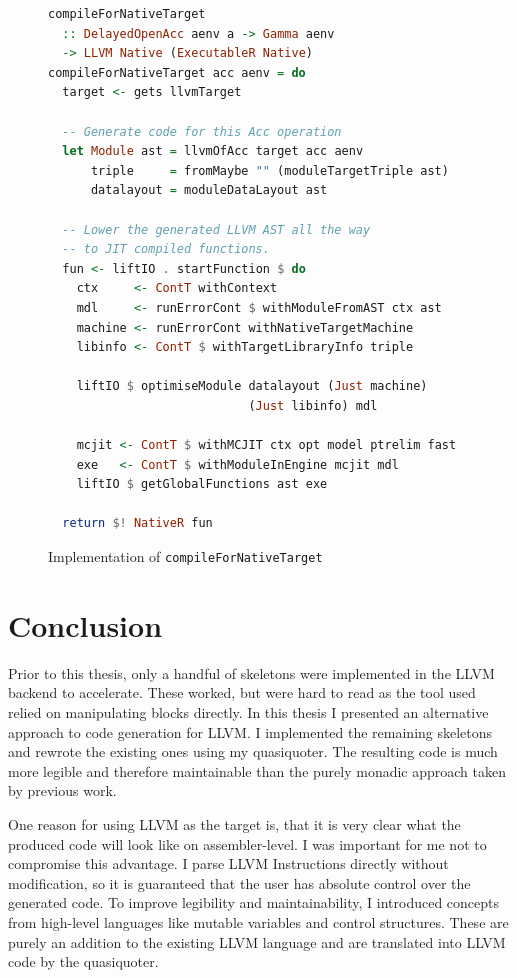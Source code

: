 \documentclass[a4paper,bibliography=totocnumbered,parskip,headsepline]{scrbook}
\begin{document}
\begin{figure}
\begin{lstlisting}[language=haskell]
compileForNativeTarget
  :: DelayedOpenAcc aenv a -> Gamma aenv
  -> LLVM Native (ExecutableR Native)
compileForNativeTarget acc aenv = do
  target <- gets llvmTarget

  -- Generate code for this Acc operation
  let Module ast = llvmOfAcc target acc aenv
      triple     = fromMaybe "" (moduleTargetTriple ast)
      datalayout = moduleDataLayout ast

  -- Lower the generated LLVM AST all the way
  -- to JIT compiled functions.
  fun <- liftIO . startFunction $ do
    ctx     <- ContT withContext
    mdl     <- runErrorCont $ withModuleFromAST ctx ast
    machine <- runErrorCont withNativeTargetMachine
    libinfo <- ContT $ withTargetLibraryInfo triple

    liftIO $ optimiseModule datalayout (Just machine)
                            (Just libinfo) mdl

    mcjit <- ContT $ withMCJIT ctx opt model ptrelim fast
    exe   <- ContT $ withModuleInEngine mcjit mdl
    liftIO $ getGlobalFunctions ast exe

  return $! NativeR fun
\end{lstlisting}
\caption{Implementation of \lstinline[language=haskell]!compileForNativeTarget!}
\label{fig:compilenative}
\end{figure}

\chapter{Conclusion}
Prior to this thesis, only a handful of skeletons were implemented in the LLVM backend to accelerate.
These worked, but were hard to read as the tool used relied on manipulating blocks directly.
In this thesis I presented an alternative approach to code generation for LLVM.
I implemented the remaining skeletons and rewrote the existing ones using my quasiquoter.
The resulting code is much more legible and therefore maintainable than the purely monadic approach taken by previous work.

One reason for using LLVM as the target is, that it is very clear what the produced code will look like on assembler-level.
I was important for me not to compromise this advantage.
I parse LLVM Instructions directly without modification, so it is guaranteed that the user has absolute control over the generated code.
To improve legibility and maintainability, I introduced concepts from high-level languages like mutable variables and control structures.
These are purely an addition to the existing LLVM language and are translated into LLVM code by the quasiquoter.
\end{document}
